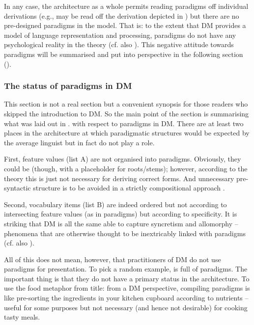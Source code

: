 \documentclass[output=paper]{langsci/langscibook}
\begin{document}
In any case, the architecture as a whole permits reading paradigms off individual derivations (e.g.,  may be read off the derivation depicted in ) but there are no pre-designed paradigms in the model. That is: to the extent that DM provides a model of language representation and processing, paradigms do not have any psychological reality in the theory (cf. also \citealt[53]{Bobaljik2002}). This negative attitude towards paradigms will be summarised and put into perspective in the following section ().


\subsubsection{The status of paradigms in DM} \label{reiner:2.2.2}

This section is not a real section but a convenient synopsis for those readers who skipped the introduction to DM. So the main point of the section is summarising what was laid out in . with respect to paradigms in DM. There are at least two places in the architecture at which paradigmatic structures would be expected by the average linguist but in fact do not play a role.

First, feature values (list A) are not organised into paradigms. Obviously, they could be (though, with a placeholder for roots/stems); however, according to the theory this is just not necessary for deriving correct forms. And unnecessary pre-syntactic structure is to be avoided in a strictly compositional approach \citep[17]{Embick2015}.\largerpage[1.5]

Second, vocabulary items (list B) are indeed ordered but not according to intersecting feature values (as in paradigms) but according to specificity. It is striking that DM is all the same able to capture syncretism and allomorphy – phenomena that are otherwise thought to be inextricably linked with paradigms (cf. also \citealt[54]{Bobaljik2002}).

All of this does not mean, however, that practitioners of DM do not use paradigms for presentation. To pick a random example, \citet{Harley2008} is full of paradigms. The important thing is that they do not have a primary status in the architecture. To use the food metaphor from  title: from a DM perspective, compiling paradigms is like pre-sorting the ingredients in your kitchen cupboard according to nutrients – useful for some purposes but not necessary (and hence not desirable) for cooking tasty meals.
\end{document}
